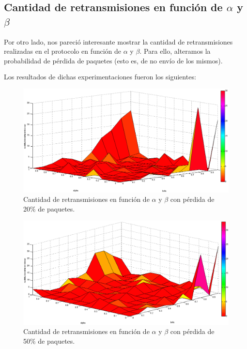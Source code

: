 \documentclass[10pt, a4paper]{article}
\begin{document}
\newpage
\subsection{Cantidad de retransmisiones en función de $\alpha$ y $\beta$}
Por otro lado, nos pareció interesante mostrar la cantidad de retransmisiones realizadas en el protocolo en función de $\alpha$ y $\beta$. Para ello, alteramos la probabilidad de pérdida de paquetes (esto es, de no envío de los mismos). 

Los resultados de dichas experimentaciones fueron los siguientes:
\begin{figure}[H]
\begin{center}
\includegraphics[width=17cm]{alphaBetaRetransmision0,2.png}
\caption{Cantidad de retransmisiones en función de $\alpha$ y $\beta$ con pérdida de 20\% de paquetes.}
\end{center}
\end{figure}

\begin{figure}[H]
\begin{center}
\includegraphics[width=17cm]{alphaBetaRetransmision0,5.png}
\caption{Cantidad de retransmisiones en función de $\alpha$ y $\beta$ con pérdida de 50\% de paquetes.}
\end{center}
\end{figure}
\end{document}
